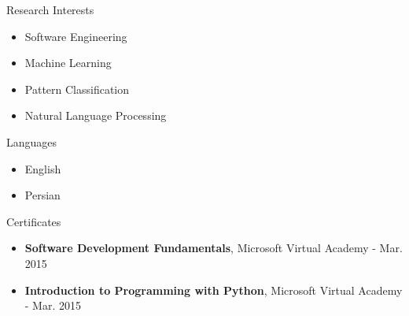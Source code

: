 \documentclass{resume} %
\begin{document}
\begin{paracol}{2}
\begin{rSection}{Research Interests}
	
	\begin{itemize}
		\item Software Engineering
		\item Machine Learning
		\item Pattern Classification
		\item Natural Language Processing
	\end{itemize}
	
\end{rSection}
\switchcolumn
\begin{rSection}{Languages}
	
	\begin{itemize}
		\item English
		\item Persian 
	\end{itemize}
	
\end{rSection}
\end{paracol}

\begin{rSection}{Certificates}
	
	\begin{itemize}
		\item \textbf{Software Development Fundamentals}, Microsoft Virtual Academy - Mar. 2015
		\item \textbf{Introduction to Programming with Python}, Microsoft Virtual Academy - Mar. 2015
	\end{itemize}
	
\end{rSection}





\end{document}
